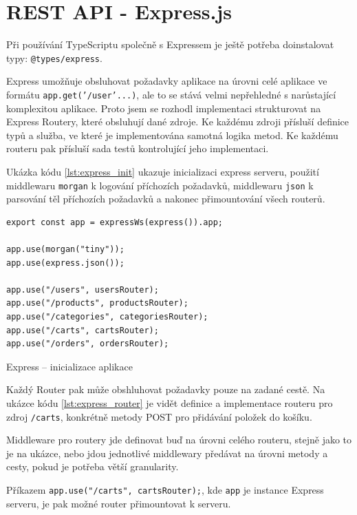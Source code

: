 \documentclass[thesis=M,czech]{FITthesis}[2019/12/23]
\begin{document}
\section{REST API - Express.js}
Při používání TypeScriptu společně s Expressem je ještě potřeba doinstalovat typy: \texttt{@types/express}.

Express umožňuje obsluhovat požadavky aplikace na úrovni celé aplikace ve formátu \texttt{app.get('/user'...)}, ale to se stává velmi nepřehledné s narůstající komplexitou aplikace. Proto jsem se rozhodl implementaci strukturovat na Express Routery, které obsluhují dané zdroje. Ke každému zdroji přísluší definice typů a služba, ve které je implementována samotná logika metod. Ke každému routeru pak přísluší sada testů kontrolující jeho implementaci.

Ukázka kódu \ref{lst:express_init} ukazuje inicializaci express serveru, použití middlewaru \texttt{morgan} k logování příchozích požadavků, middlewaru \texttt{json} k parsování těl příchozích požadavků a nakonec přimountování všech routerů.

\begin{listing}[H]
\begin{verbatim}
export const app = expressWs(express()).app;

app.use(morgan("tiny"));
app.use(express.json());

app.use("/users", usersRouter);
app.use("/products", productsRouter);
app.use("/categories", categoriesRouter);
app.use("/carts", cartsRouter);
app.use("/orders", ordersRouter);

\end{verbatim}
\caption{Express -- inicializace aplikace}
\label{lst:express_init}
\end{listing}

Každý Router pak může obshluhovat požadavky pouze na zadané cestě. Na ukázce kódu \ref{lst:express_router} je vidět definice a implementace routeru pro zdroj \texttt{/carts}, konkrétně metody POST pro přidávání položek do košíku.

Middleware pro routery jde definovat buď na úrovni celého routeru, stejně jako to je na ukázce, nebo jdou jednotlivé middlewary předávat na úrovni metody a cesty, pokud je potřeba větší granularity.

Příkazem \texttt{app.use("/carts", cartsRouter);}, kde \texttt{app} je instance Express serveru, je pak možné router přimountovat k serveru.
\end{document}
